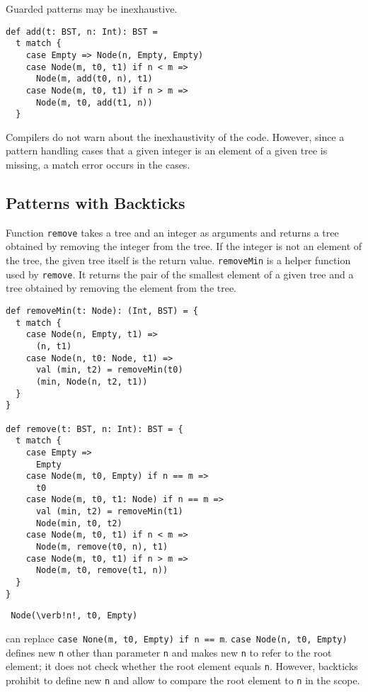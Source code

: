 Guarded patterns may be inexhaustive.

\begin{verbatim}
def add(t: BST, n: Int): BST =
  t match {
    case Empty => Node(n, Empty, Empty)
    case Node(m, t0, t1) if n < m =>
      Node(m, add(t0, n), t1)
    case Node(m, t0, t1) if n > m =>
      Node(m, t0, add(t1, n))
  }
\end{verbatim}

Compilers do not warn about the inexhaustivity of the code. However, since a
pattern handling cases that a given integer is an element of a given tree is
missing, a match error occurs in the cases.

\subsection{Patterns with Backticks}

Function \verb!remove! takes a tree and an integer as arguments and returns a
tree obtained by removing the integer from the tree. If the integer is not an
element of the tree, the given tree itself is the return value. \verb!removeMin!
is a helper function used by \verb!remove!. It returns the pair of the smallest
element of a given tree and a tree obtained by removing the element from the
tree.

\begin{verbatim}
def removeMin(t: Node): (Int, BST) = {
  t match {
    case Node(n, Empty, t1) =>
      (n, t1)
    case Node(n, t0: Node, t1) =>
      val (min, t2) = removeMin(t0)
      (min, Node(n, t2, t1))
  }
}

def remove(t: BST, n: Int): BST = {
  t match {
    case Empty =>
      Empty
    case Node(m, t0, Empty) if n == m =>
      t0
    case Node(m, t0, t1: Node) if n == m =>
      val (min, t2) = removeMin(t1)
      Node(min, t0, t2)
    case Node(m, t0, t1) if n < m =>
      Node(m, remove(t0, n), t1)
    case Node(m, t0, t1) if n > m =>
      Node(m, t0, remove(t1, n))
  }
}
\end{verbatim}

\begin{verbatim} Node(\verb!n!, t0, Empty)\end{verbatim} can replace
\verb!case None(m, t0, Empty) if n == m!. \verb!case Node(n, t0, Empty)! defines new
\verb!n! other than parameter \verb!n! and makes new \verb!n! to refer to the
root element; it does not check whether the root element equals \verb!n!.
However, backticks prohibit to define new \verb!n! and allow to compare the root
element to \verb!n! in the scope.

